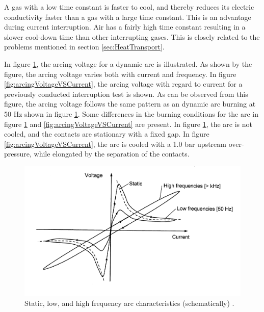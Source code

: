 \documentclass[10pt,b5paper,twoside]{article}
\begin{document}
A gas with a low time constant is faster to cool, and thereby reduces its electric conductivity faster than a gas with a large time constant. This is an advantage during current interruption. Air has a fairly high time constant resulting in a slower cool-down time than other interrupting gases. This is closely related to the problems mentioned in section \ref{sec:HeatTransport}. 

In figure \ref{fig:arcingVoltageFre}, the arcing voltage for a dynamic arc is illustrated. As shown by the figure, the arcing voltage varies both with current and frequency. In figure \ref{fig:arcingVoltageVSCurrent}, the arcing voltage with regard to current for a previously conducted interruption test is shown. As can be observed from this figure, the arcing voltage follows the same pattern as an dynamic arc burning at 50 Hz shown in figure \ref{fig:arcingVoltageFre}. Some differences in the burning conditions for the arc in figure \ref{fig:arcingVoltageFre} and \ref{fig:arcingVoltageVSCurrent} are present. In figure \ref{fig:arcingVoltageFre}, the arc is not cooled, and the contacts are stationary with a fixed gap. In figure \ref{fig:arcingVoltageVSCurrent}, the arc is cooled with a 1.0 bar upstream over-pressure, while elongated by the separation of the contacts.

\begin{figure}[H]
\centering
\includegraphics[scale=1]{Bilder/Theory/dynamicArcingVoltage.png}
\caption{Static, low, and high frequency arc characteristics (schematically) \cite{bib:HVEbreak}.} \label{fig:arcingVoltageFre}
\end{figure}
\end{document}

